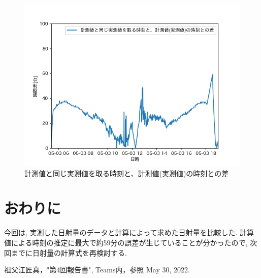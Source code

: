 \documentclass[a4j,12pt,]{jarticle}
\begin{document}
\begin{figure}[H]
  \begin{center}
    \includegraphics[width=160mm]{timeDiff.png}
    \caption{計測値と同じ実測値を取る時刻と、計測値(実測値)の時刻との差}
    \label{p2}
  \end{center}
\end{figure}

\section{おわりに}
今回は, 実測した日射量のデータと計算によって求めた日射量を比較した.
計算値による時刻の推定に最大で約59分の誤差が生じていることが分かったので, 次回までに日射量の計算式を再検討する.

\begin{thebibliography}{5}
  祖父江匠真，"第4回報告書", Teams内，参照 May 30, 2022.
\end{thebibliography}
\end{document}
